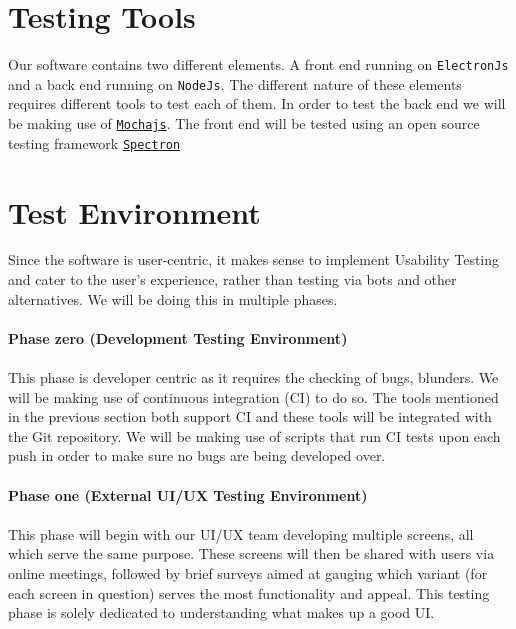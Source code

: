 \documentclass[a4paper, 11pt]{article}
\begin{document}
\section{Testing Tools}
Our software contains two different elements. A front end running on \texttt{ElectronJs} and a back end running on \texttt{NodeJs}. The different nature of these elements requires different tools to test each of them. In order to test the back end we will be making use of \texttt{\hyperlink{https://mochajs.org/}{Mochajs}}. The front end will be tested using an open source testing framework \texttt{\hyperlink{https://www.electronjs.org/spectron}{Spectron}}
\section{Test Environment}
Since the software is user-centric, it makes sense to implement Usability Testing and cater to the user's experience, rather than testing via bots and other alternatives. We will be doing this in multiple phases.
\newpage
\paragraph{Phase zero (Development Testing Environment)}
\paragraph{}
This phase is developer centric as it requires the checking of bugs, blunders. We will be making use of continuous integration (CI) to do so. The tools mentioned in the previous section both support CI and these tools will be integrated with the Git repository. We will be making use of scripts that run CI tests upon each push in order to make sure no bugs are being developed over. 
\paragraph{Phase one (External UI/UX Testing Environment)}
\paragraph{}
This phase will begin with our UI/UX team developing multiple screens, all which serve the same purpose. These screens will then be shared with users via online meetings, followed by brief surveys aimed at gauging which variant (for each screen in question) serves the most functionality and appeal. This testing phase is solely dedicated to understanding what makes up a good UI.
\end{document}

